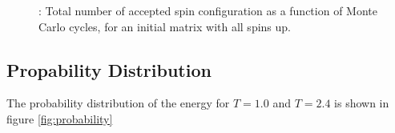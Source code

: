 \documentclass{article}
\begin{document}
{{	\begin{figure}[H]
	\caption{: Total number of accepted spin configuration as a function of Monte Carlo cycles, for an initial matrix with all spins up. }
	\label{fig:flips_random}
	\end{figure}

\subsection{Propability Distribution}
	The probability distribution of the energy for $T = 1.0$ and $T = 2.4$ is shown in figure \ref{fig:probability}

}}
\end{document}
